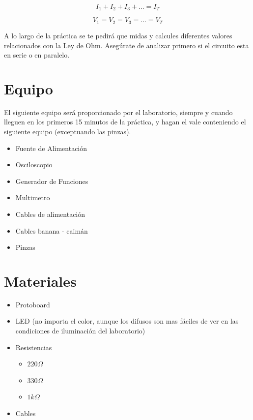 		\begin{equation}
			I_1 + I_2 + I_3 + ... = I_T
		\end{equation}

		\begin{equation}
			V_1 = V_2 = V_3 = ... = V_T
		\end{equation}

		A lo largo de la práctica se te pedirá que midas y calcules diferentes valores relacionados con la Ley de Ohm. Asegúrate de analizar primero si el circuito esta en serie o en paralelo.


\section{Equipo}

	El siguiente equipo será proporcionado por el laboratorio, siempre y cuando lleguen en los primeros 15 minutos de la práctica, y hagan el vale conteniendo el siguiente equipo (exceptuando las pinzas).

	\begin{itemize}
		\item Fuente de Alimentación
		\item Osciloscopio
		\item Generador de Funciones
		\item Multimetro
		\item Cables de alimentación
		\item Cables banana - caimán
		\item Pinzas
	\end{itemize}


\section{Materiales}

	\begin{itemize}
		\item Protoboard
		\item LED (no importa el color, aunque los difusos son mas fáciles de ver en las condiciones de iluminación del laboratorio)
		\item Resistencias
		\begin{itemize}
			\item $220 \Omega$
			\item $330 \Omega$
			\item $1 k\Omega$
		\end{itemize}
		\item Cables
	\end{itemize}

